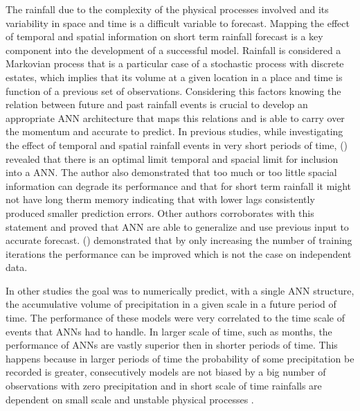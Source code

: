 The rainfall due to the complexity of the physical processes involved and its variability in space and time is a difficult variable to forecast. Mapping the effect of temporal and spatial information on short term rainfall forecast is a key component into the development of a successful model. Rainfall is considered a Markovian process \cite{luk2000study} that  is a particular case of a stochastic process with discrete estates, which implies that its volume at a given location in a place and time is function of a previous set of observations. Considering this factors knowing the relation between future and past rainfall events is crucial to develop an appropriate ANN architecture that maps this relations and is able to carry over the momentum and accurate to predict. In previous studies, while investigating the effect of temporal and spatial rainfall events in very short periods of time, \citeauthor{luk2000study} (\citeyear{luk2000study}) revealed that there is an optimal limit temporal and spacial limit for inclusion into a ANN. The author also demonstrated that too much or too little spacial information can degrade its performance and that for short term rainfall it might not have long therm memory indicating that with lower lags consistently produced smaller prediction errors. Other authors corroborates with this statement and proved that ANN are able to generalize and use previous input to accurate forecast. \citeauthor{french1992rainfall} (\citeyear{french1992rainfall}) demonstrated that by only increasing the number of training iterations the performance can be improved which is not the case on independent data.


In other studies \cite{kumarasiri2006rainfall, nasseri2008optimized, ramirez2006linear, luk2000study, french1992rainfall, toth2000comparison, partal2015daily} the goal was to numerically predict, with a single ANN structure, the accumulative volume of precipitation in a given scale in a future period of time. The performance of these models were very correlated to the time scale of events that ANNs had to handle. In larger scale of time, such as months, the performance of ANNs are vastly superior then in shorter periods of time. This happens because in larger periods of time the probability of some precipitation be recorded is greater, consecutively models are not biased by a big number of observations with zero precipitation \cite{schoof2001downscaling} and in short scale of time rainfalls are dependent on small scale and unstable physical processes \cite{kuligowski1998localized}.

